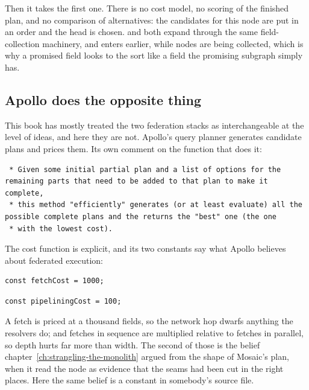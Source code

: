 Then it takes the first one. There is no cost model, no scoring of the finished
plan, and no comparison of alternatives: the candidates for this node are put in
an order and the head is chosen.  and  both expand
through the same field-collection machinery, and  enters earlier,
while nodes are being collected, which is why a promised field looks to the sort
like a field the promising subgraph simply has.

\subsection*{Apollo does the opposite thing}

%
This book has mostly treated the two federation stacks as interchangeable at the
level of ideas, and here they are not. Apollo's query planner generates
candidate plans and prices them. Its own comment on the function that does it:

\begin{verbatim}
 * Given some initial partial plan and a list of options for the remaining parts that need to be added to that plan to make it complete,
 * this method "efficiently" generates (or at least evaluate) all the possible complete plans and the returns the "best" one (the one
 * with the lowest cost).
\end{verbatim}

The cost function is explicit, and its two constants say what Apollo believes
about federated execution:

\begin{verbatim}
const fetchCost = 1000;
\end{verbatim}

\begin{verbatim}
const pipeliningCost = 100;
\end{verbatim}

A fetch is priced at a thousand fields, so the network hop dwarfs anything the
resolvers do; and fetches in sequence are multiplied relative to fetches in
parallel, so depth hurts far more than width. The second of those is the belief
chapter~\ref{ch:strangling-the-monolith} argued from the shape of Mosaic's plan,
when it read the  node as evidence that the seams had been cut in
the right places. Here the same belief is a constant in somebody's source file.


